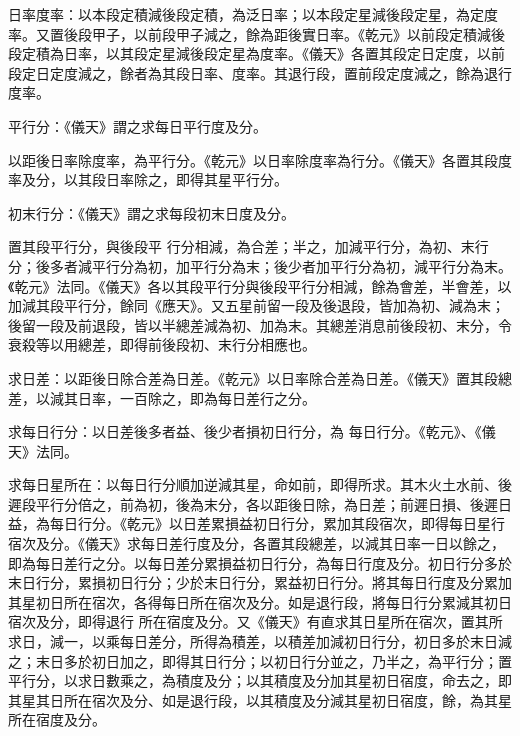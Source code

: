\begin{pinyinscope}
 日率度率：以本段定積減後段定積，為泛日率；以本段定星減後段定星，為定度率。又置後段甲子，以前段甲子減之，餘為距後實日率。《乾元》以前段定積減後段定積為日率，以其段定星減後段定星為度率。《儀天》各置其段定日定度，以前段定日定度減之，餘者為其段日率、度率。其退行段，置前段定度減之，餘為退行度率。



 平行分：《儀天》謂之求每日平行度及分。



 以距後日率除度率，為平行分。《乾元》以日率除度率為行分。《儀天》各置其段度率及分，以其段日率除之，即得其星平行分。



 初末行分：《儀天》謂之求每段初末日度及分。



 置其段平行分，與後段平
 行分相減，為合差；半之，加減平行分，為初、末行分；後多者減平行分為初，加平行分為末；後少者加平行分為初，減平行分為末。《乾元》法同。《儀天》各以其段平行分與後段平行分相減，餘為會差，半會差，以加減其段平行分，餘同《應天》。又五星前留一段及後退段，皆加為初、減為末；後留一段及前退段，皆以半總差減為初、加為末。其總差消息前後段初、末分，令衰殺等以用總差，即得前後段初、末行分相應也。



 求日差：以距後日除合差為日差。《乾元》以日率除合差為日差。《儀天》置其段總差，以減其日率，一百除之，即為每日差行之分。



 求每日行分：以日差後多者益、後少者損初日行分，為
 每日行分。《乾元》、《儀天》法同。



 求每日星所在：以每日行分順加逆減其星，命如前，即得所求。其木火土水前、後遲段平行分倍之，前為初，後為末分，各以距後日除，為日差；前遲日損、後遲日益，為每日行分。《乾元》以日差累損益初日行分，累加其段宿次，即得每日星行宿次及分。《儀天》求每日差行度及分，各置其段總差，以減其日率一日以餘之，即為每日差行之分。以每日差分累損益初日行分，為每日行度及分。初日行分多於末日行分，累損初日行分；少於末日行分，累益初日行分。將其每日行度及分累加其星初日所在宿次，各得每日所在宿次及分。如是退行段，將每日行分累減其初日宿次及分，即得退行
 所在宿度及分。又《儀天》有直求其日星所在宿次，置其所求日，減一，以乘每日差分，所得為積差，以積差加減初日行分，初日多於末日減之；末日多於初日加之，即得其日行分；以初日行分並之，乃半之，為平行分；置平行分，以求日數乘之，為積度及分；以其積度及分加其星初日宿度，命去之，即其星其日所在宿次及分、如是退行段，以其積度及分減其星初日宿度，餘，為其星所在宿度及分。




\end{pinyinscope}
